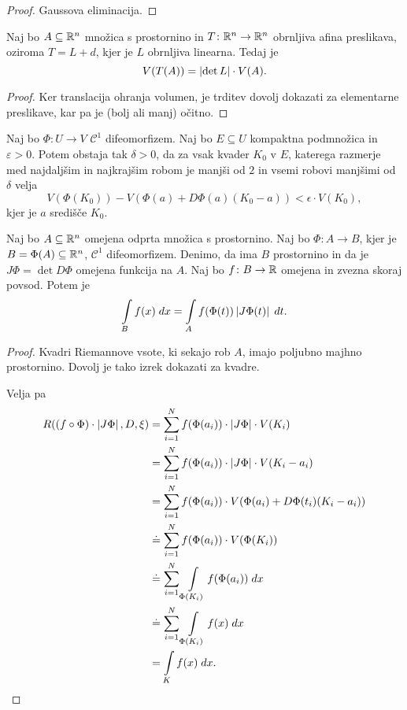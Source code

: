 \begin{proof}
Gaussova eliminacija.
\end{proof}

\begin{trditev}
Naj bo $A \subseteq \mathbb{R}^n$ množica s prostornino in
$T \colon \mathbb{R}^n \to \mathbb{R}^n$ obrnljiva afina preslikava, oziroma
$T = L + d$, kjer je $L$ obrnljiva linearna. Tedaj je
\[
V(T(A)) = \left\lvert \det L\right\rvert \cdot V(A).
\]
\end{trditev}

\begin{proof}
Ker translacija ohranja volumen, je trditev dovolj dokazati za
elementarne preslikave, kar pa je (bolj ali manj) očitno.
\end{proof}


\begin{trditev}
Naj bo $\Phi \colon U \to V$ $\mathcal{C}^1$ difeomorfizem. Naj bo
$E \subseteq U$ kompaktna podmnožica in $\varepsilon > 0$. Potem
obstaja tak $\delta > 0$, da za vsak kvader $K_0$ v $E$, katerega
razmerje med najdaljšim in najkrajšim robom je manjši od $2$ in
vsemi robovi manjšimi od $\delta$ velja
\[
V(\Phi(K_0)) - V(\Phi(a)+D\Phi(a)(K_0-a)) < \epsilon \cdot V(K_0),
\]
kjer je $a$ središče $K_0$.
\end{trditev}

\begin{izrek}
Naj bo $A \subseteq \mathbb{R}^n$ omejena odprta množica s prostornino. Naj
bo $\Phi \colon A \to B$, kjer je $B = \Phi(A) \subseteq \mathbb{R}^n$,
$\mathcal{C}^1$ difeomorfizem. Denimo, da ima $B$ prostornino in da
je $J\Phi = \det D\Phi$ omejena funkcija na $A$. Naj bo
$f \colon B \to \mathbb{R}$ omejena in zvezna skoraj povsod. Potem je
\[
\int\limits_B f(x)\;dx = \int\limits_A f(\Phi(t)) \left\lvert J\Phi(t)\right\rvert\;dt.
\]
\end{izrek}

\begin{proof}
Kvadri Riemannove vsote, ki sekajo rob $A$, imajo poljubno majhno
prostornino. Dovolj je tako izrek dokazati za kvadre.

Velja pa
\begin{align*}
R((f \circ \Phi) \cdot \left\lvert J\Phi\right\rvert,D,\xi) &=
\sum_{i=1}^N f(\Phi(a_i)) \cdot \left\lvert J\Phi\right\rvert \cdot V(K_i)
\\
&=
\sum_{i=1}^N f(\Phi(a_i)) \cdot \left\lvert J\Phi\right\rvert \cdot V(K_i - a_i)
\\
&=
\sum_{i=1}^N f(\Phi(a_i)) \cdot V(\Phi(a_i)+D\Phi(t_i)(K_i-a_i))
\\
&\doteq \sum_{i=1}^N f(\Phi(a_i)) \cdot V(\Phi(K_i))
\\
&\doteq \sum_{i=1}^N \int\limits_{\Phi(K_i)} f(\Phi(a_i))\;dx
\\
&\doteq \sum_{i=1}^N \int\limits_{\Phi(K_i)} f(x)\;dx
\\
&= \int\limits_K f(x)\;dx.
\qedhere
\end{align*}
\end{proof}

